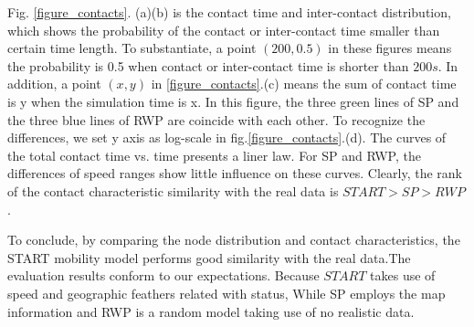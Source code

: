 Fig. \ref{figure_contacts}. (a)(b) is the contact time and inter-contact distribution, which shows the probability of the contact or inter-contact time smaller than certain time length. To substantiate, a point $(200,0.5)$ in these figures means the probability is 0.5 when contact or inter-contact time is shorter than $200s$. In addition, a point $(x,y)$ in \ref{figure_contacts}.(c) means the sum of contact time is y when the simulation time is x. In this figure, the three green lines of SP and the three blue lines of RWP are coincide with each other. To recognize the differences, we set y axis as log-scale in fig.\ref{figure_contacts}.(d).
The curves of the total contact time vs. time presents a liner law. For SP and RWP, the differences of speed ranges show little influence on these curves.
Clearly, the rank of the contact characteristic similarity with the real data is $START>SP>RWP$.

To conclude, by comparing the node distribution and contact characteristics, the START mobility model performs good similarity with the real data.The evaluation results conform to our expectations. Because $START$ takes use of speed and geographic feathers related with status, While SP employs the map information and RWP is a random model taking use of no realistic data.


